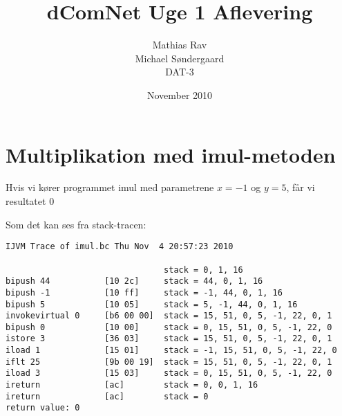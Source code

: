\documentclass[12pt,a4paper]{article}
\begin{document}
\title{dComNet Uge 1 Aflevering}
\author{Mathias Rav \\
		Michael Søndergaard \\
		DAT-3}
\date{November 2010}
\maketitle

\section{Multiplikation med imul-metoden}
Hvis vi kører programmet imul med parametrene $x=-1$ og $y=5$, får vi resultatet $0$

Som det kan ses fra stack-tracen:

\begin{lstlisting}
IJVM Trace of imul.bc Thu Nov  4 20:57:23 2010

                                stack = 0, 1, 16
bipush 44           [10 2c]     stack = 44, 0, 1, 16
bipush -1           [10 ff]     stack = -1, 44, 0, 1, 16
bipush 5            [10 05]     stack = 5, -1, 44, 0, 1, 16
invokevirtual 0     [b6 00 00]  stack = 15, 51, 0, 5, -1, 22, 0, 1
bipush 0            [10 00]     stack = 0, 15, 51, 0, 5, -1, 22, 0
istore 3            [36 03]     stack = 15, 51, 0, 5, -1, 22, 0, 1
iload 1             [15 01]     stack = -1, 15, 51, 0, 5, -1, 22, 0
iflt 25             [9b 00 19]  stack = 15, 51, 0, 5, -1, 22, 0, 1
iload 3             [15 03]     stack = 0, 15, 51, 0, 5, -1, 22, 0
ireturn             [ac]        stack = 0, 0, 1, 16
ireturn             [ac]        stack = 0
return value: 0
\end{lstlisting}
\end{document}
